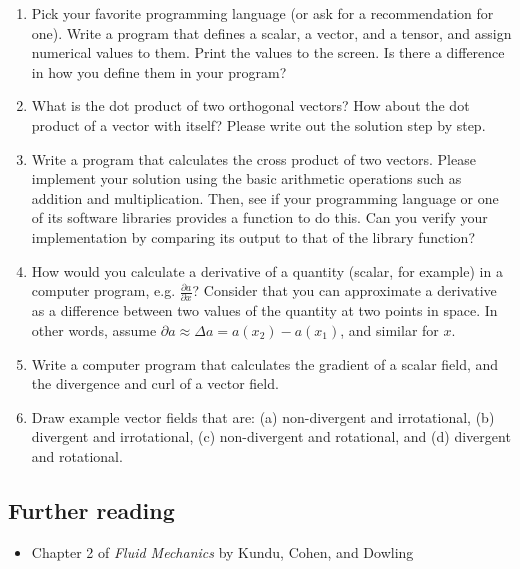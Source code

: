 \documentclass[12pt]{article}
\numberwithin{equation}{section}
\numberwithin{figure}{section}
\numberwithin{table}{section}
\begin{document}
\begin{enumerate}
  
  \item Pick your favorite programming language (or ask for a recommendation for one).
  Write a program that defines a scalar, a vector, and a tensor, and assign
  numerical values to them.
  Print the values to the screen.
  Is there a difference in how you define them in your program?

  \item What is the dot product of two orthogonal vectors?
  How about the dot product of a vector with itself?
  Please write out the solution step by step.

  \item Write a program that calculates the cross product of two vectors.
  Please implement your solution using the basic arithmetic operations such as
  addition and multiplication.
  Then, see if your programming language or one of its software libraries
  provides a function to do this.
  Can you verify your implementation by comparing its output to that of the
  library function?

  \item How would you calculate a derivative of a quantity
  (scalar, for example) in a computer program, e.g. $\frac{\partial a}{\partial x}$?
  Consider that you can approximate a derivative as a difference between two
  values of the quantity at two points in space.
  In other words, assume $\partial a \approx \Delta a = a(x_2) - a(x_1)$,
  and similar for $x$.

  \item Write a computer program that calculates the gradient of a scalar field,
  and the divergence and curl of a vector field.
  
  \item Draw example vector fields that are: (a) non-divergent and irrotational,
  (b) divergent and irrotational, (c) non-divergent and rotational, and (d)
  divergent and rotational.
\end{enumerate}

\subsection*{Further reading}

\begin{itemize}
  \item Chapter 2 of \textit{Fluid Mechanics} by Kundu, Cohen, and Dowling
\end{itemize}
\end{document}
